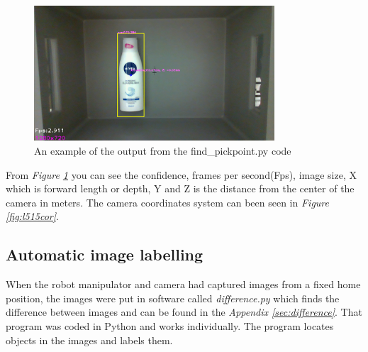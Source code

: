 \begin{figure}[h]
    \centering
    \includegraphics[width=0.8\textwidth]{graphics/findpickpoint.png}
    \caption{An example of the output from the find\_pickpoint.py code}
    \label{fig:findpickpoint}
\end{figure}

From \textit{Figure \ref{fig:findpickpoint}} you can see the confidence, frames per second(Fps), image size, X which is forward length or depth, Y and Z is the distance from the center of the camera in meters. 
The camera coordinates system can been seen in \textit{Figure \ref{fig:l515cor}}.


\subsection{Automatic image labelling}\label{labelimg}
When the robot manipulator and camera had captured images from a fixed home position, the images were put in software called \textit{difference.py} which finds the difference between images and can be found in the \textit{Appendix \ref{sec:difference}}. That program was coded in Python and works individually. The program locates objects in the images and labels them. 
